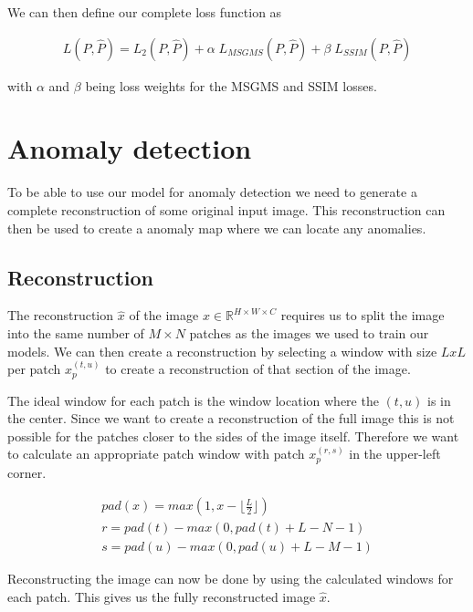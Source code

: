 
We can then define our complete loss function as 

\begin{align}
L(P, \hat{P}) = L_2(P, \hat{P}) + \alpha \; L_{MSGMS}(P, \hat{P}) + \beta \; L_{SSIM}(P, \hat{P})
\end{align}

with $\alpha$ and $\beta$ being loss weights for the MSGMS and SSIM losses.

\section{Anomaly detection}\label{sec:methods-setup-ad}

To be able to use our model for anomaly detection we need to generate a complete reconstruction of some original input image. This reconstruction can then be used to create a anomaly map where we can locate any anomalies.

\subsection{Reconstruction}

The reconstruction $\hat{x}$ of the image $x \in \mathbb{R}^{H \times W \times C}$ requires us to split the image into the same number of $M \times N$ patches as the images we used to train our models.
We can then create a reconstruction by selecting a window with size $L x L$ per patch $x_p^{(t,u)}$ to create a reconstruction of that section of the image.

The ideal window for each patch is the window location where the $(t,u)$ is in the center. Since we want to create a reconstruction of the full image this is not possible for the patches closer to the sides of the image itself. Therefore we want to calculate an appropriate patch window with patch $x_p^{(r,s)}$ in the upper-left corner.

%
\begin{align}
pad(x) = max(1, x - \lfloor \frac{L}{2} \rfloor)\\
r = pad(t) - max(0, pad(t) + L - N - 1)\\
s = pad(u) - max(0, pad(u) + L - M - 1)
\end{align}
%

Reconstructing the image can now be done by using the calculated windows for each patch. This gives us the fully reconstructed image $\hat{x}$.

